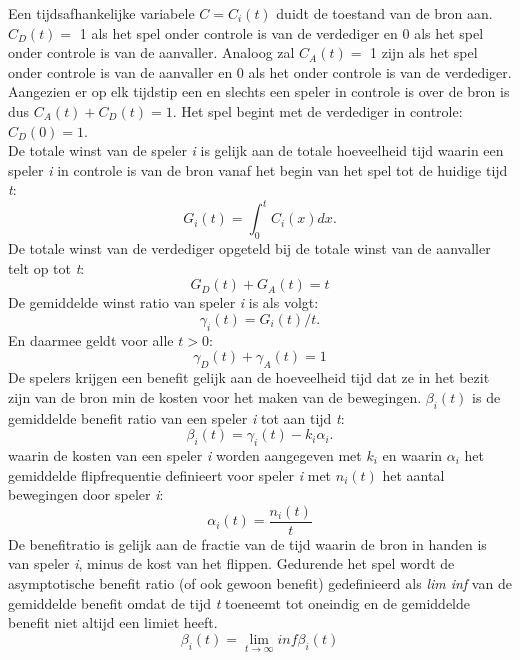 \documentclass[master=cws, masteroption=vs,english]{kulemt}
\begin{document}
\begin{abstract*}
Een tijdsafhankelijke variabele $ C = C_{i}(t) $ duidt de toestand van de bron aan.
$ C_{D}(t) =$  1 als het spel onder controle is van de verdediger en 0 als het spel onder controle is van de aanvaller. Analoog zal $ C_{A}(t) =$ 1 zijn als het spel onder controle is van de aanvaller en 0 als het onder controle is van de verdediger. Aangezien er op elk tijdstip een en slechts een speler in controle is over de bron is dus  $ C_{A}(t) +  C_{D}(t) = 1 $.
Het spel begint met de verdediger in controle: $ C_{D}(0) = 1 $. \\



De totale winst van de speler \textit{i} is gelijk aan de totale hoeveelheid tijd waarin een speler \textit{i} in controle is van de bron vanaf het begin van het spel tot de huidige tijd \textit{t}:
\begin{equation}
G_{i}(t) = \int_0^t \! C_{i}(x) dx.
\end{equation}
De totale winst van de verdediger opgeteld bij de totale winst van de aanvaller telt op tot \textit{t}:
\begin{equation} 
G_{D}(t) + G_{A}(t) = t
\end{equation}
De gemiddelde winst ratio van speler \textit{i} is als volgt:
\begin{equation}
\gamma_{i}(t) = G_{i}(t) / t.
\end{equation}
En daarmee geldt voor alle $ t> 0 $:
\begin{equation} 
\gamma_{D}(t) + \gamma_{A}(t) = 1
\end{equation}
De spelers krijgen een benefit gelijk aan de hoeveelheid tijd dat ze in het bezit zijn van de bron min de kosten voor het maken van de bewegingen. 
$ \beta_{i}(t) $ is de gemiddelde benefit ratio van een speler \textit{i} tot aan tijd \textit{t}:
\begin{equation}
\beta_{i}(t) = \gamma_{i}(t) - k_{i} \alpha_{i}.
\end{equation}
waarin de kosten van een speler \textit{i} worden aangegeven met $ k_{i} $ en waarin $\alpha_{i}$ het gemiddelde flipfrequentie definieert voor speler \textit{i} met $n_{i}(t)$ het aantal bewegingen door speler \textit{i}:
\begin{equation}
\alpha_{i}(t) = \dfrac{n_{i}(t)}{t}
\end{equation}
De benefitratio is gelijk aan de fractie van de tijd waarin de bron in handen is van speler \textit{i}, minus de kost van het flippen.
Gedurende het spel wordt de asymptotische benefit ratio (of ook gewoon benefit) gedefinieerd als \textit{lim inf} van de gemiddelde benefit omdat de tijd \textit{t} toeneemt tot oneindig en de gemiddelde benefit niet altijd een limiet heeft.
\begin{equation}
\beta_{i} (t) = \lim_{t \to \infty } inf \beta_{i}(t)
\end{equation}
\\



\end{abstract*}
\end{document}
